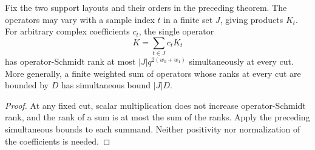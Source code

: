 \begin{lemma}
    \label{thm:huang_weighted_interval_layer_ranks}
    \leanok
    Fix the two support layouts and their orders in the preceding theorem. The
    operators may vary with a sample index $t$ in a finite set $J$, giving products
    $K_t$. For arbitrary complex coefficients $c_t$, the single operator
    \[
        K=\sum_{t\in J}c_tK_t
    \]
    has operator-Schmidt rank at most $|J|q^{2(w_0+w_1)}$ simultaneously at every cut.
    More generally, a finite weighted sum of operators whose ranks at every cut
    are bounded by $D$ has simultaneous bound $|J|D$.
\end{lemma}
\begin{proof}
    \leanok
    At any fixed cut, scalar multiplication does not increase operator-Schmidt
    rank, and the rank of a sum is at most the sum of the ranks. Apply the preceding
    simultaneous bounds to each summand. Neither positivity nor normalization of
    the coefficients is needed.
\end{proof}
